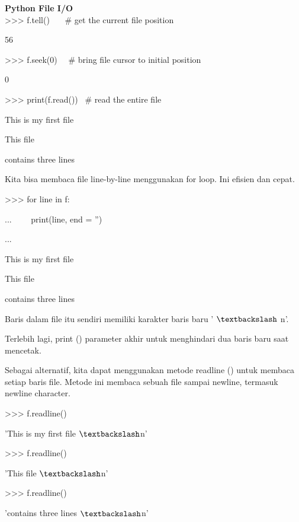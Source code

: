 \begin{center}{\fontsize{24pt}{24pt}\selectfont \textbf{Python File I/O} \\}
>>> f.tell()~~~  $  \#  $ get the current file position 

56 
\vspace{12pt}
 
>>> f.seek(0)~~  $  \#  $ bring file cursor to initial position 

0 
\vspace{12pt}
 
>>> print(f.read())~  $  \#  $ read the entire file 

This is my first file

This file 

contains three lines 
\vspace{12pt}
\vspace{16pt}
 
Kita bisa membaca file line-by-line menggunakan for loop. Ini efisien dan cepat. 
\vspace{12pt}

>>> for line in f: 

...~~~~ print(line, end = '') 

... 

This is my first file 

This file 

contains three lines 
\vspace{12pt}
\vspace{12pt}
 
Baris dalam file itu sendiri memiliki karakter baris baru ' $  \textbackslash  $ n'. 
\vspace{12pt}

Terlebih lagi, print () parameter akhir untuk menghindari dua baris baru saat mencetak. 
\vspace{12pt}
 
Sebagai alternatif, kita dapat menggunakan metode readline () untuk membaca setiap baris file. Metode ini membaca sebuah file sampai newline, termasuk newline character. 
\vspace{12pt}

>>> f.readline() 

'This is my first file $  \textbackslash  $n' 
\vspace{12pt}

>>> f.readline() 

'This file $  \textbackslash  $n' 
\vspace{12pt}

>>> f.readline() 

'contains three lines $  \textbackslash  $n' 
\vspace{12pt}


\end{center}
